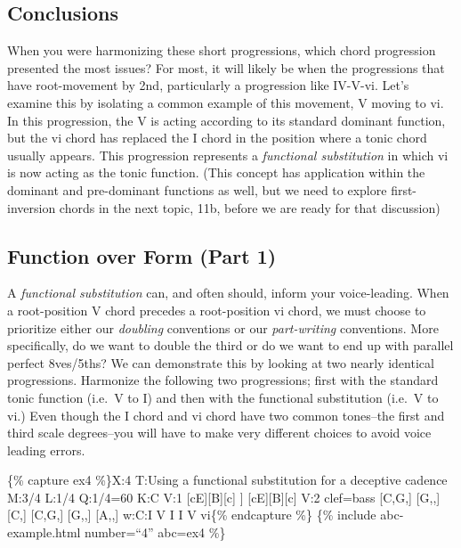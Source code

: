 \documentclass{book}
\begin{document}
\hypertarget{conclusions-47}{%
\subsection{Conclusions}\label{conclusions-47}}

When you were harmonizing these short progressions, which chord progression
presented the most issues? For most, it will likely be when the progressions
that have root-movement by 2nd, particularly a progression like IV-V-vi. Let's
examine this by isolating a common example of this movement, V moving to vi.
In this progression, the V is acting according to its standard dominant
function, but the vi chord has replaced the I chord in the position where a
tonic chord usually appears. This progression represents a \emph{functional
substitution} in which vi is now acting as the tonic function. (This concept
has application within the dominant and pre-dominant functions as well, but we
need to explore first-inversion chords in the next topic, 11b, before we are
ready for that discussion)

\hypertarget{function-over-form-part-1}{%
\subsection{Function over Form (Part 1)}\label{function-over-form-part-1}}

A \emph{functional substitution} can, and often should, inform your
voice-leading. When a root-position V chord precedes a root-position vi chord,
we must choose to prioritize either our \emph{doubling} conventions or our
\emph{part-writing} conventions. More specifically, do we want to double the
third or do we want to end up with parallel perfect 8ves/5ths? We can
demonstrate this by looking at two nearly identical progressions. Harmonize
the following two progressions; first with the standard tonic function (i.e.~V
to I) and then with the functional substitution (i.e.~V to vi.) Even though
the I chord and vi chord have two common tones--the first and third scale
degrees--you will have to make very different choices to avoid voice leading
errors.

\{\% capture ex4 \%\}X:4 T:Using a functional substitution for a deceptive
cadence M:3/4 L:1/4 Q:1/4=60 K:C V:1 {[}cE{]}{[}B{]}{[}c{]}\textbar{} {]}
{[}cE{]}{[}B{]}{[}c{]}\textbar{]} V:2 clef=bass {[}C,G,{]} {[}G,,{]}
{[}C,{]}\textbar{} {[}C,G,{]} {[}G,,{]} {[}A,,{]}\textbar{]} w:C:I V I I V
vi\{\% endcapture \%\} \{\% include abc-example.html number=``4'' abc=ex4 \%\}
\end{document}
